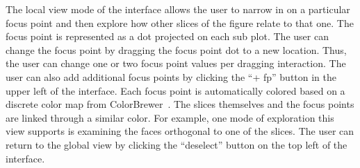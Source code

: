 The local view mode of the interface allows the user to narrow in on a
particular focus point and then explore how other slices of the figure relate
to that one.  The focus point is represented as a dot projected on each sub
plot. 
The user can change the focus point by dragging the
focus point dot to a new location. Thus, the user can change one or two focus
point values per dragging interaction.  The user can also add additional focus
points by clicking the ``+ fp'' button in the upper left of the interface. Each
focus point is automatically colored based on a discrete color map from
ColorBrewer~\cite{Harrower:2003}. The slices themselves and the focus points
are linked through a similar color.  For example, one mode of exploration this
view supports is examining the faces orthogonal to one of the slices.  The user
can return to the global view by clicking the ``deselect'' button on the top
left of the interface.


